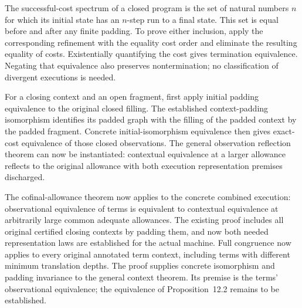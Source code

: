 


The successful-cost spectrum of a closed program is the set of natural numbers
$n$ for which its initial state has an $n$-step run to a final state. This set
is equal before and after any finite padding. To prove either inclusion, apply
the corresponding refinement with the equality cost order and eliminate the
resulting equality of costs. Existentially quantifying the cost gives
termination equivalence. Negating that equivalence also preserves
nontermination; no classification of divergent executions is needed.



For a closing context and an open fragment, first apply initial padding
equivalence to the original closed filling. The established context-padding
isomorphism identifies its padded graph with the filling of the padded context
by the padded fragment. Concrete initial-isomorphism equivalence then gives
exact-cost equivalence of those closed observations. The general observation
reflection theorem can now be instantiated: contextual equivalence at a
larger allowance reflects to the original allowance with both execution
representation premises discharged.



The cofinal-allowance theorem now applies to the concrete combined execution:
observational equivalence of terms is equivalent to contextual equivalence at
arbitrarily large common adequate allowances. The existing proof includes all
original certified closing contexts by padding them, and now both needed
representation laws are established for the actual machine.
Full congruence now applies to every original annotated term context,
including terms with different minimum translation depths. The proof supplies
concrete isomorphism and padding invariance to the general context theorem.
Its premise is the terms' observational equivalence; the equivalence of
Proposition~12.2 remains to be established.

